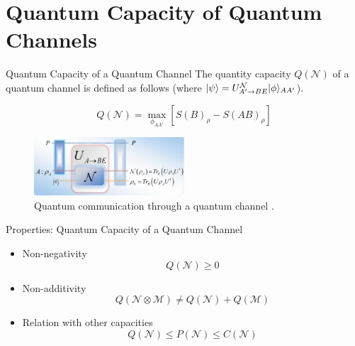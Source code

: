 \section{Quantum Capacity of Quantum Channels}

\begin{frame}{Quantum Capacity of a Quantum Channel}
The quantity capacity $Q(\mathcal{N})$ of a quantum channel is defined as follows (where $\lvert\psi\rangle = U^{\mathcal{N}}_{A' \rightarrow BE} \lvert\phi\rangle_{AA'}$).
\begin{tcolorbox}
$$Q(\mathcal{N}) = \max_{\phi_{AA'}} \left[ S(B)_\rho - S(AB)_\rho \right]$$
\end{tcolorbox}

\begin{figure}
    \includegraphics[width=0.5\textwidth]{figures/quantum_communication_quantum_channel.png}
    \caption{Quantum communication through a quantum channel \cite{Gyongyosi_2018}.}
\end{figure}
\end{frame}

\begin{frame}{Properties: Quantum Capacity of a Quantum Channel}
\begin{itemize}
    \setlength{\itemsep}{1.5em}
    \item Non-negativity
    $$Q(\mathcal{N}) \geq 0$$
    \item Non-additivity
    $$Q(\mathcal{N} \otimes \mathcal{M}) \neq Q(\mathcal{N}) + Q(\mathcal{M})$$
    \item Relation with other capacities
    $$Q(\mathcal{N}) \leq P(\mathcal{N}) \leq C(\mathcal{N})$$
\end{itemize}
\end{frame}

